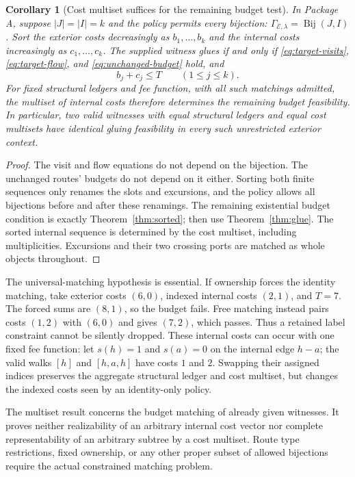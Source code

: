 \documentclass[11pt]{article}
\newtheorem{corollary}[definition]{Corollary}
\theoremstyle{remark}
\newcommand{\Bij}{\operatorname{Bij}}
\begin{document}
\begin{corollary}[Cost multiset suffices for the remaining budget test]
\label{cor:multiset}
In Package A, suppose $|J|=|I|=k$ and the policy permits every bijection:
$\Gamma_{\mathcal E,\lambda}=\Bij(J,I)$. Sort the exterior costs decreasingly
as $b_1,\ldots,b_k$ and the internal costs increasingly as
$c_1,\ldots,c_k$. The supplied witness glues if and only if
\eqref{eq:target-visits}, \eqref{eq:target-flow}, and
\eqref{eq:unchanged-budget} hold, and
\[
 b_j+c_j\le T\qquad(1\le j\le k).
\]
For fixed structural ledgers and fee function, with all such matchings
admitted, the multiset of internal costs therefore determines the remaining
budget feasibility. In particular, two valid witnesses with equal structural
ledgers and equal cost multisets have identical gluing feasibility in every
such unrestricted exterior context.
\end{corollary}
\begin{proof}
The visit and flow equations do not depend on the bijection. The unchanged
routes' budgets do not depend on it either. Sorting both finite sequences
only renames the slots and excursions, and the policy allows all bijections
before and after these renamings. The remaining existential budget condition
is exactly Theorem~\ref{thm:sorted}; then use Theorem~\ref{thm:glue}.
The sorted internal sequence is determined by the cost multiset, including
multiplicities. Excursions and their two crossing ports are matched as whole
objects throughout.
\end{proof}

The universal-matching hypothesis is essential. If ownership forces the
identity matching, take exterior costs $(6,0)$, indexed internal costs
$(2,1)$, and $T=7$. The forced sums are $(8,1)$, so the budget fails.
Free matching instead pairs costs $(1,2)$ with $(6,0)$ and gives $(7,2)$,
which passes. Thus a retained label constraint cannot be silently dropped.
These internal costs can occur with one fixed fee function: let $s(h)=1$
and $s(a)=0$ on the internal edge $h-a$; the valid walks $[h]$ and
$[h,a,h]$ have costs $1$ and $2$. Swapping their assigned indices preserves
the aggregate structural ledger and cost multiset, but changes the indexed
costs seen by an identity-only policy.

The multiset result concerns the budget matching of already given witnesses.
It proves neither realizability of an arbitrary internal cost vector nor
complete representability of an arbitrary subtree by a cost multiset. Route
type restrictions, fixed ownership, or any other proper subset of allowed
bijections require the actual constrained matching problem.
\end{document}

